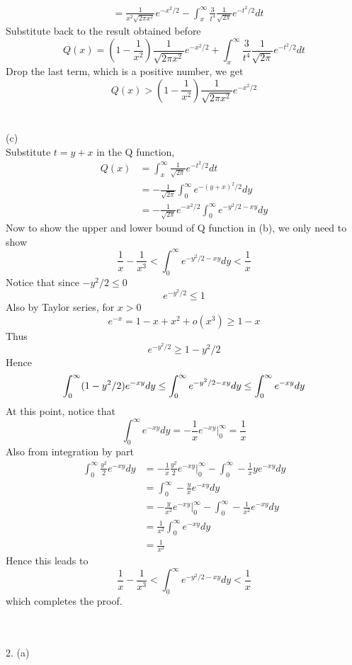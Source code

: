 \documentclass [12pt] {article}
\begin{document}
\begin{spacing}{1.5}
\begin{align*}
&= \frac{1}{x^2\sqrt{2\pi x^2}} e^{-x^2/2} -  \int_x^\infty \frac{3}{t^4} \frac{1}{\sqrt{2\pi}}e^{-t^2/2} dt
\end{align*}
Substitute back to the result obtained before
$$ Q(x) = (1-\frac{1}{x^2})\frac{1}{\sqrt{2\pi x^2}} e^{-x^2/2} + \int_x^\infty \frac{3}{t^4} \frac{1}{\sqrt{2\pi}}e^{-t^2/2} dt$$
Drop the last term, which is a positive number, we get
$$ Q(x) > (1-\frac{1}{x^2})\frac{1}{\sqrt{2\pi x^2}} e^{-x^2/2}$$
~\\
\pagebreak
~\\
(c)\\
Substitute $ t= y + x $ in the Q function,  \begin{align*}
Q(x) &= \int_x^\infty \frac{1}{\sqrt{2\pi}}e^{-t^2/2} dt\\
&= -\frac{1}{\sqrt{2\pi}} \int_0^\infty e^{-(y+x)^2/2} dy\\
&=-\frac{1}{\sqrt{2\pi}} e^{-x^2/2}\int_0^\infty e^{-y^2/2 -xy} dy
\end{align*}
Now to show the upper and lower bound of Q function in (b), we only need to show
$$ \frac{1}{x} -\frac{1}{x^3} < \int_0^\infty e^{-y^2/2 -xy} dy < \frac{1}{x} $$
Notice that since $-y^2/2 \leq 0$
$$ e^{-y^2/2} \leq 1 $$
Also by Taylor series, for $x > 0$
$$e^{-x} = 1 - x + x^2 + o(x^3) \geq 1 - x $$
Thus
$$e^{-y^2/2} \geq 1-y^2/2$$
Hence 
$$\int_0^\infty (1-y^2/2)e^{-xy} dy \leq \int_0^\infty e^{-y^2/2 -xy} dy \leq \int_0^\infty e^{-xy} dy\\$$
At this point, notice that
$$ \int_0^\infty e^{-xy} dy = -\frac{1}{x} e^{-xy}\Big|_0^\infty =\frac{1}{x} $$
Also from integration by part\begin{align*}
\int_0^\infty \frac{y^2}{2} e^{-xy} dy &=  -\frac{1}{x} \frac{y^2}{2} e^{-xy}\Big|_0^\infty - \int_0^\infty -\frac{1}{x} y e^{-xy} dy\\
&= \int_0^\infty -\frac{y}{x} e^{-xy} dy\\
&=  -\frac{y}{x^2} e^{-xy}\Big|_0^\infty - \int_0^\infty -\frac{1}{x^2} e^{-xy} dy\\
&= \frac{1}{x^2}\int_0^\infty e^{-xy} dy\\
&= \frac{1}{x^3}
\end{align*}
Hence this leads to
$$ \frac{1}{x} -\frac{1}{x^3} < \int_0^\infty e^{-y^2/2 -xy} dy < \frac{1}{x} $$
which completes the proof.
\end {spacing}
~\\
~\\
2. (a)\\
~\\
\end{document}
